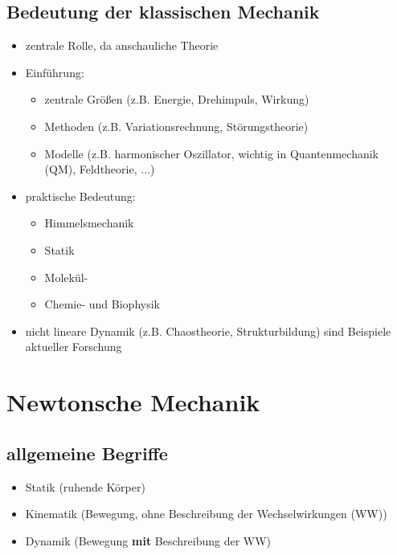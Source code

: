 \documentclass[titlepage,12pt,a4paper,ngerman]{report}
\begin{document}
\section*{Bedeutung der klassischen Mechanik}
\begin{itemize}
\item zentrale Rolle, da anschauliche Theorie
\item Einführung:
\begin{itemize}
	\item zentrale Größen (z.B. Energie, Drehimpuls, Wirkung)
	\item Methoden (z.B. Variationsrechnung, Störungstheorie)
	\item Modelle (z.B. harmonischer Oszillator, wichtig in Quantenmechanik (QM), Feldtheorie, ...)
\end{itemize}
\item praktische Bedeutung:
\begin{itemize}
	\item Himmelsmechanik
	\item Statik
	\item Molekül-
	\item Chemie- und Biophysik
\end{itemize}
\item nicht lineare Dynamik (z.B. Chaostheorie, Strukturbildung) sind Beispiele aktueller Forschung
\end{itemize}

\chapter{Newtonsche Mechanik}
\section{allgemeine Begriffe}
\begin{itemize}
\item Statik (ruhende Körper)
\item Kinematik (Bewegung, ohne Beschreibung der Wechselwirkungen (WW))
\item Dynamik (Bewegung \textbf{mit} Beschreibung der WW)
\end{itemize}
\end{document}
